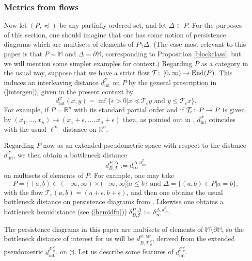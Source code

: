 \documentclass[11pt]{amsart}
\theoremstyle{definition}
\theoremstyle{remark}
\numberwithin{equation}{section}
\def\co{\colon\thinspace}
\def\ep{\epsilon}
\def\R{\mathbb{R}}
\begin{document}
 
\subsubsection{Metrics from flows}\label{flowmetrics}

Now let $(P,\preceq)$ be any partially ordered set, and let $\Delta\subset P$.  For the purposes of this section, one should imagine that one has some notion of persistence diagrams which are multisets of elements of $P\setminus \Delta$. (The case most relevant to this paper is that $P=\mathbb{M}$ and $\Delta=\partial\mathbb{M}$, corresponding to Proposition \ref{blockclass}, but we will mention some simpler examples for context.) Regarding $P$ as a category in the usual way, suppose that we have a strict flow $\mathcal{T}\co [0,\infty)\to\mathrm{End}(P)$. This induces an interleaving distance $d_{\mathrm{int}}^{\mathcal{T}}$ on $P$ by the general prescription in (\ref{intergen}), given in the present context by \[ d_{\mathrm{int}}^{\mathcal{T}}(x,y)=\inf\{\ep>0|x\preceq \mathcal{T}_{\ep}y\mbox{ and }y\leq \mathcal{T}_{\ep}x\}.  \]  For example, if $P=\R^n$ with its standard partial order and if $\mathcal{T}_{\ep}\co P\to P$ is given by $(x_1,\ldots,x_n)\mapsto (x_1+\ep,\ldots,x_n+\ep)$ then, as pointed out in \cite[Theorem 3.9]{dSMS}, $d_{\mathrm{int}}^{\mathcal{T}}$ coincides with the usual $\ell^{\infty}$ distance on $\R^n$.

Regarding $P$ now as an extended pseudometric space with respect to the distance $d_{\mathrm{int}}^{\mathcal{T}}$, we then obtain a bottleneck distance \[ d_{B,\mathcal{T}}^{P,\Delta}:=d^{\Delta,d_{\mathrm{int}}^{\mathcal{T}}}_{\infty} \] on multisets of elements of $P$.  For example, one may take \[ P=\{(a,b)\in (-\infty,\infty)\times (-\infty,\infty]|a\leq b\}\mbox{ and }\Delta=\{(a,b)\in P|a=b\},\] with the flow $\mathcal{T}_{\ep}(a,b)=(a+\ep,b+\ep)$, and then one obtains the usual bottleneck distance on persistence diagrams from \cite{CEH07}.  Likewise one obtains a bottleneck hemidistance (see (\ref{hemidfn})) $\delta_{B,\mathcal{T}}^{P,\Delta}:=\delta^{\Delta,d_{\mathrm{int}}^{\mathcal{T}}}_{\infty}$.

The persistence diagrams in this paper are multisets of elements of $\mathbb{M}\setminus\partial\mathbb{M}$, so the bottleneck distance of interest for us will be $d_{B,\mathcal{T}^{\varphi}_{\mathbb{M}}}^{\mathbb{M},\partial\mathbb{M}}$, derived from the extended pseudometric $d_{\mathrm{int}}^{\mathcal{T}_{\mathbb{M}}^{\varphi}}$. on $\mathbb{M}$.  Let us describe some features of   $d_{\mathrm{int}}^{\mathcal{T}_{\mathbb{M}}^{\varphi}}$.
\end{document}
